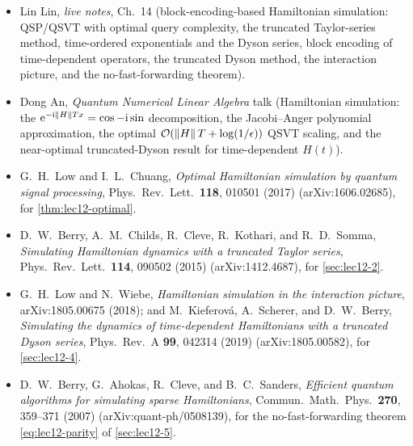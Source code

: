 \readingsection
\begin{itemize}[leftmargin=1.4em]
  \item Lin Lin, \emph{live notes}, Ch.~14 (block-encoding-based Hamiltonian simulation:
        QSP/QSVT with optimal query complexity, the truncated Taylor-series method,
        time-ordered exponentials and the Dyson series, block encoding of time-dependent
        operators, the truncated Dyson method, the interaction picture, and the
        no-fast-forwarding theorem).
  \item Dong An, \emph{Quantum Numerical Linear Algebra} talk (Hamiltonian simulation:
        the $\mathrm{e}^{-\mathrm{i}\left\lVert H \right\rVert Tx}=\cos-\mathrm{i}\sin$ decomposition, the Jacobi--Anger polynomial
        approximation, the optimal $\mathcal{O}(\left\lVert H \right\rVert T+\log(1/\epsilon))$ QSVT scaling, and the
        near-optimal truncated-Dyson result for time-dependent $H(t)$).
  \item G.~H.~Low and I.~L.~Chuang, \emph{Optimal Hamiltonian simulation by quantum signal
        processing}, Phys.\ Rev.\ Lett.\ \textbf{118}, 010501 (2017) (arXiv:1606.02685),
        for \cref{thm:lec12-optimal}.
  \item D.~W.~Berry, A.~M.~Childs, R.~Cleve, R.~Kothari, and R.~D.~Somma,
        \emph{Simulating Hamiltonian dynamics with a truncated Taylor series}, Phys.\ Rev.\
        Lett.\ \textbf{114}, 090502 (2015) (arXiv:1412.4687), for \cref{sec:lec12-2}.
  \item G.~H.~Low and N.~Wiebe, \emph{Hamiltonian simulation in the interaction picture},
        arXiv:1805.00675 (2018); and M.~Kieferov\'a, A.~Scherer, and D.~W.~Berry,
        \emph{Simulating the dynamics of time-dependent Hamiltonians with a truncated Dyson
        series}, Phys.\ Rev.\ A \textbf{99}, 042314 (2019) (arXiv:1805.00582), for
        \cref{sec:lec12-4}.
  \item D.~W.~Berry, G.~Ahokas, R.~Cleve, and B.~C.~Sanders, \emph{Efficient quantum
        algorithms for simulating sparse Hamiltonians}, Commun.\ Math.\ Phys.\ \textbf{270},
        359--371 (2007) (arXiv:quant-ph/0508139), for the no-fast-forwarding theorem
        \eqref{eq:lec12-parity} of \cref{sec:lec12-5}.
\end{itemize}
